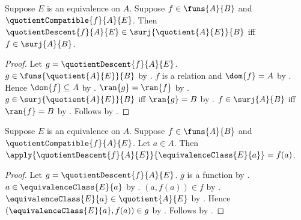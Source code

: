 \begin{theorem}\label{quotient_descent_surjective_iff}
    Suppose $E$ is an equivalence on $A$.
    Suppose $f\in\funs{A}{B}$ and
        $\quotientCompatible{f}{A}{E}$.
    Then
        $\quotientDescent{f}{A}{E}
                \in\surj{\quotient{A}{E}}{B}$
        iff $f\in\surj{A}{B}$.
\end{theorem}
\begin{proof}
    Let $g=\quotientDescent{f}{A}{E}$.
    $g\in\funs{\quotient{A}{E}}{B}$ by
        .
    $f$ is a relation and $\dom{f}=A$ by
        .
    Hence $\dom{f}\subseteq A$ by .
    $\ran{g}=\ran{f}$ by
        .
    $g\in\surj{\quotient{A}{E}}{B}$ iff $\ran{g}=B$ by
        .
    $f\in\surj{A}{B}$ iff $\ran{f}=B$ by
        .
    Follows by \auto.
\end{proof}

\begin{proposition}\label{quotient_descent_apply}
    Suppose $E$ is an equivalence on $A$.
    Suppose $f\in\funs{A}{B}$ and $\quotientCompatible{f}{A}{E}$.
    Let $a\in A$.
    Then
        $\apply{\quotientDescent{f}{A}{E}}{\equivalenceClass{E}{a}}
            =f(a)$.
\end{proposition}
\begin{proof}
    Let $g=\quotientDescent{f}{A}{E}$.
    $g$ is a function by .
    $a\in\equivalenceClass{E}{a}$ by
        .
    $(a,f(a))\in f$ by
        .
    $\equivalenceClass{E}{a}\in\quotient{A}{E}$ by .
    Hence $(\equivalenceClass{E}{a},f(a))\in g$ by
        .
    Follows by .
\end{proof}

